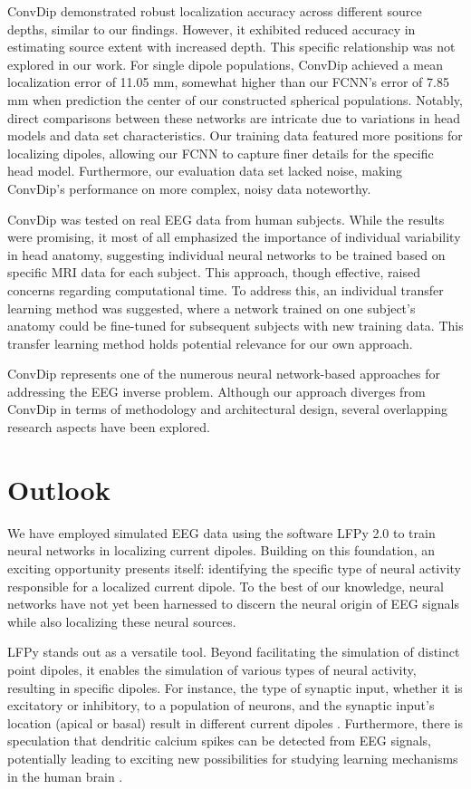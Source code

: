 \documentclass[a4paper, UKenglish, 11pt]{uiomaster}
\begin{document}
ConvDip demonstrated robust localization accuracy across different source depths, similar to our findings. However, it exhibited reduced accuracy in estimating source extent with increased depth. This specific relationship was not explored in our work. For single dipole populations, ConvDip achieved a mean localization error of 11.05 mm, somewhat higher than our FCNN's error of 7.85 mm when prediction the center of our constructed spherical populations. Notably, direct comparisons between these networks are intricate due to variations in head models and data set characteristics. Our training data featured more positions for localizing dipoles, allowing our FCNN to capture finer details for the specific head model. Furthermore, our evaluation data set lacked noise, making ConvDip's performance on more complex, noisy data noteworthy.

ConvDip was tested on real EEG data from human subjects. While the results were promising, it most of all emphasized the importance of individual variability in head anatomy, suggesting individual neural networks to be trained based on specific MRI data for each subject. This approach, though effective, raised concerns regarding computational time. To address this, an individual transfer learning method was suggested, where a network trained on one subject's anatomy could be fine-tuned for subsequent subjects with new training data. This transfer learning method holds potential relevance for our own approach.

ConvDip represents one of the numerous neural network-based approaches for addressing the EEG inverse problem. Although our approach diverges from ConvDip in terms of methodology and architectural design, several overlapping research aspects have been explored.


\section{Outlook} \label{sec:outlook}
We have employed simulated EEG data using the software LFPy 2.0 to train neural networks in localizing current dipoles. Building on this foundation, an exciting opportunity presents itself: identifying the specific type of neural activity responsible for a localized current dipole. To the best of our knowledge, neural networks have not yet been harnessed to discern the neural origin of EEG signals while also localizing these neural sources.

LFPy stands out as a versatile tool. Beyond facilitating the simulation of distinct point dipoles, it enables the simulation of various types of neural activity, resulting in specific dipoles. For instance, the type of synaptic input, whether it is excitatory or inhibitory, to a population of neurons, and the synaptic input's location (apical or basal) result in different current dipoles \cite{LFPy}.  Furthermore, there is speculation that dendritic calcium spikes can be detected from EEG signals, potentially leading to exciting new possibilities for studying learning mechanisms in the human brain \cite{suzuki2017dendritic}.
\end{document}
